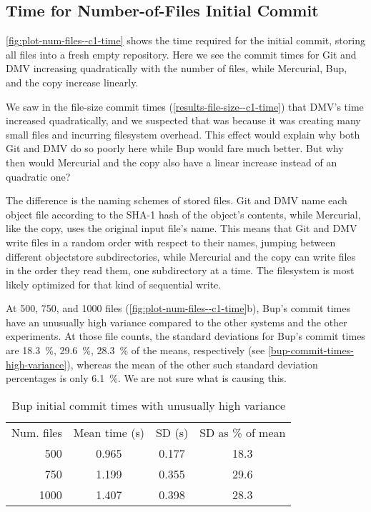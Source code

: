 \cleardoublepage

\subsection{Time for Number-of-Files Initial Commit}
\label{results-num-files--c1-time}

\autoref{fig:plot-num-files--c1-time} shows the time required for the initial
\gls{commit}, storing all files into a fresh empty \gls{repository}. Here we see
the commit times for Git and DMV increasing quadratically with the number of
files, while Mercurial, Bup, and the copy increase linearly.

We saw in the file-size commit times (\autoref{results-file-size--c1-time}) that
DMV's time increased quadratically, and we suspected that was because it was
creating many small files and incurring filesystem overhead. This effect would
explain why both Git and DMV do so poorly here while Bup would fare much better.
But why then would Mercurial and the copy also have a linear increase instead of
an quadratic one?

The difference is the naming schemes of stored files. Git and DMV name each
object file according to the SHA-1 hash of the object's contents, while
Mercurial, like the copy, uses the original input file's name. This means that
Git and DMV write files in a random order with respect to their names, jumping
between different \gls{objectstore} subdirectories, while Mercurial and the copy
can write files in the order they read them, one subdirectory at a time. The
filesystem is most likely optimized for that kind of sequential write.

At \num{500}, \num{750}, and \num{1000} files
(\autoref{fig:plot-num-files--c1-time}b), Bup's commit times have an unusually
high variance compared to the other systems and the other experiments. At those
file counts, the standard deviations for Bup's commit times are
\SI{18.3}{\percent}, \SI{29.6}{\percent}, \SI{28.3}{\percent} of the means,
respectively (see \autoref{bup-commit-times-high-variance}), whereas the mean of
the other such standard deviation percentages is only \SI{6.1}{\percent}. We are
not sure what is causing this.

\begin{table}[b]
    \caption{Bup initial commit times with unusually high variance}
    \label{bup-commit-times-high-variance}
    \centering
    \begin{tabular}{rccc}
        Num. files & Mean time (s) & SD (s) & SD as \% of mean \\
           500  &   0.965  &   0.177  &  18.3 \\
           750  &   1.199  &   0.355  &  29.6 \\
          1000  &   1.407  &   0.398  &  28.3 \\
    \end{tabular}
\end{table}

